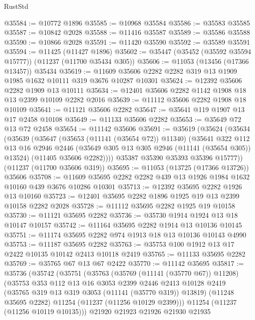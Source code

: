 \begin{lexlean}{RustStd}
\begin{coremodule}
@35584 := @10772 @1896
@35585 := @10968 @35584
@35586 := @35583 @35585
@35587 := @10842 @2028
@35588 := @11416 @35587
@35589 := @35586 @35588
@35590 := @10866 @2028
@35591 := @11420 @35590
@35592 := @35589 @35591
@35594 := @11425 (@11427 @1896)
@35602 := @35447 (@35452 (@35592 @35594 @15777)) (@11237 (@11700 @35434 @305))
@35606 := @11053 (@13456 (@17366 @13457)) @35434
@35619 := @11609 @35606 @2282 @2282 @319 @13 @1909 @1985 @1632 @10111 @319 @3676 @10287 @10301
@35624 := @12392 @35606 @2282 @1909 @13 @10111
@35634 := @12401 @35606 @2282 @1142 @1908 @18 @13 @2399 @10109 @2282 @2016
@35639 := @11112 @35606 @2282 @1908 @18 @10109
@35641 := @11121 @35606 @2282
@35647 := @35641 @119 @1907 @13 @17 @2458 @10108
@35649 := @11133 @35606 @2282
@35653 := @35649 @72 @13 @72 @2458
@35654 := @11142 @35606
@35691 := @35619
    (@35624
      (@35634
        (@35639
          (@35647
            (@35653 (@11141 (@35654 @72)) @11340)
            (@35641
              @322
              @112
              @13
              @16
              @2946
              @2446
              (@35649 @305 @13 @305 @2946 (@11141 (@35654 @305)) @13524)
              (@11405 @35606 @2282))))
        @35387
        @35390
        @35393
        @35396
        @15777))
    (@11237 (@11700 @35606 @319))
@35695 := @11053 (@13725 (@17366 @13726)) @35606
@35708 := @11609 @35695 @2282 @2282 @439 @13 @1926 @1984 @1632 @10160 @439 @3676 @10286 @10301
@35713 := @12392 @35695 @2282 @1926 @13 @10160
@35723 := @12401 @35695 @2282 @1896 @1925 @19 @13 @2399 @10158 @2282 @2028
@35728 := @11112 @35695 @2282 @1925 @19 @10158
@35730 := @11121 @35695 @2282
@35736 := @35730 @1914 @1924 @13 @18 @10147 @10157
@35742 := @11164 @35695 @2282 @1914 @13 @10136 @10145
@35751 := @11174 @35695 @2282 @974 @1913 @18 @13 @10136 @10143 @4990
@35753 := @11187 @35695 @2282
@35763 := @35753 @100 @1912 @13 @17 @2422 @10135 @10142 @2413 @10118 @2419
@35765 := @11133 @35695 @2282
@35769 := @35765 @67 @13 @67 @2422
@35770 := @11142 @35695
@35817 := @35736
    (@35742
      (@35751
        (@35763
          (@35769 (@11141 (@35770 @67)) @11208)
          (@35753
            @353
            @112
            @13
            @16
            @3053
            @2399
            @2446
            @2413
            @10128
            @2419
            (@35765 @319 @13 @319 @3053 (@11141 (@35770 @319)) @13819)
            (@11248 @35695 @2282)
            @11254
            (@11237 (@11256 @10129 @2399)))
          @11254
          (@11237 (@11256 @10119 @10135)))
        @21920
        @21923
        @21926
        @21930
        @21935

\end{coremodule}
\end{lexlean}
